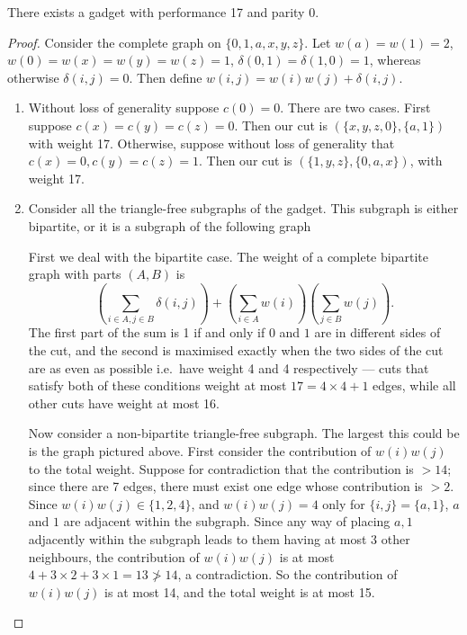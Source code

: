 \documentclass[a4paper,11pt, DIV=11]{scrartcl}
\theoremstyle{plain}
\theoremstyle{definition}
\begin{document}
\begin{lemma}
    There exists a gadget with performance 17 and parity 0.
\end{lemma}
\begin{proof}
    Consider the complete graph on $\{0, 1, a, x, y, z\}$. Let $w(a) = w(1) = 2$, $w(0) = w(x) = w(y) = w(z) = 1$, $\delta(0, 1) = \delta(1, 0) = 1$, whereas otherwise $\delta(i, j) = 0$. Then define $w(i, j) = w(i) w(j) + \delta(i, j)$.

    \begin{enumerate}
        \item Without loss of generality suppose $c(0) = 0$. There are two cases. First suppose $c(x) = c(y) = c(z) = 0$. Then our cut is $(\{x, y, z, 0\}, \{a, 1\})$ with weight 17. Otherwise, suppose without loss of generality that $c(x) = 0, c(y) = c(z) = 1$. Then our cut is $(\{ 1, y, z\}, \{ 0, a, x\})$, with weight 17.
        \item Consider all the triangle-free subgraphs of the gadget. This subgraph is either bipartite, or it is a subgraph of the following graph
\begin{center}
\end{center}
    First we deal with the bipartite case. The weight of a complete bipartite graph with parts $(A, B)$ is
    \[
    \left(\sum_{i \in A, j \in B} \delta(i, j)\right) + \left(\sum_{i \in A} w(i)\right)\left( \sum_{j \in B} w(j)\right).
    \]
    The first part of the sum is 1 if and only if $0$ and $1$ are in different sides of the cut, and the second is maximised exactly when the two sides of the cut are as even as possible i.e.~have weight 4 and 4 respectively --- cuts that satisfy both of these conditions weight at most $17 = 4 \times 4 + 1$ edges, while all other cuts have weight at most 16.
    
    Now consider a non-bipartite triangle-free subgraph. The largest this could be is the graph pictured above. First consider the contribution of $w(i) w(j)$ to the total weight. Suppose for contradiction that the contribution is $> 14$; since there are 7 edges, there must exist one edge whose contribution is $> 2$. Since $w(i) w(j) \in \{1, 2, 4\}$, and $w(i)w(j) = 4$ only for $\{i, j \} = \{ a, 1 \}$, $a$ and $1$ are adjacent within the subgraph. Since any way of placing $a, 1$ adjacently within the subgraph leads to them having at most 3 other neighbours, the contribution of $w(i) w(j)$ is at most $4 + 3 \times 2 + 3 \times 1 = 13 \not > 14$, a contradiction. So the contribution of $w(i) w(j)$ is at most 14, and the total weight is at most 15.


\end{enumerate}
\end{proof}
\end{document}
